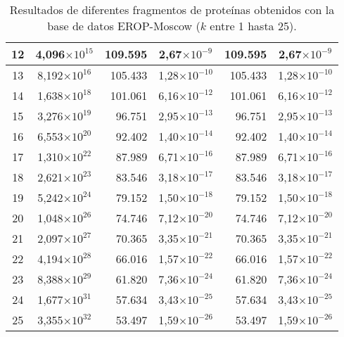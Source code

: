\begin{table}[!hbt]
\begin{tabular}{| c  r  r  c  r  c |}
    12 & \multicolumn{1}{c}{4,096$\times 10^{15}$} & 109.595 & 2,67$\times 10^{-9}$ & 109.595 & 2,67$\times 10^{-9}$ \\ \hline  
    13 & \multicolumn{1}{c}{8,192$\times 10^{16}$} & 105.433 & 1,28$\times 10^{-10}$ & 105.433 & 1,28$\times 10^{-10}$ \\ \hline
    14 & \multicolumn{1}{c}{1,638$\times 10^{18}$} & 101.061 & 6,16$\times 10^{-12}$ & 101.061 & 6,16$\times 10^{-12}$ \\ \hline  
    15 & \multicolumn{1}{c}{3,276$\times 10^{19}$} & 96.751 & 2,95$\times 10^{-13}$ & 96.751 & 2,95$\times 10^{-13}$ \\ \hline
    16 & \multicolumn{1}{c}{6,553$\times 10^{20}$} & 92.402 & 1,40$\times 10^{-14}$ & 92.402 & 1,40$\times 10^{-14}$ \\ \hline  
    17 & \multicolumn{1}{c}{1,310$\times 10^{22}$} & 87.989 & 6,71$\times 10^{-16}$ & 87.989 & 6,71$\times 10^{-16}$ \\ \hline
    18 & \multicolumn{1}{c}{2,621$\times 10^{23}$} & 83.546 & 3,18$\times 10^{-17}$ & 83.546 & 3,18$\times 10^{-17}$ \\ \hline  
    19 & \multicolumn{1}{c}{5,242$\times 10^{24}$} & 79.152 & 1,50$\times 10^{-18}$ & 79.152 & 1,50$\times 10^{-18}$ \\ \hline
    20 & \multicolumn{1}{c}{1,048$\times 10^{26}$} & 74.746 & 7,12$\times 10^{-20}$ & 74.746 & 7,12$\times 10^{-20}$ \\ \hline  
    21 & \multicolumn{1}{c}{2,097$\times 10^{27}$} & 70.365 & 3,35$\times 10^{-21}$ & 70.365 & 3,35$\times 10^{-21}$ \\ \hline
    22 & \multicolumn{1}{c}{4,194$\times 10^{28}$} & 66.016 & 1,57$\times 10^{-22}$ & 66.016 & 1,57$\times 10^{-22}$ \\ \hline  
    23 & \multicolumn{1}{c}{8,388$\times 10^{29}$} & 61.820 & 7,36$\times 10^{-24}$ & 61.820 & 7,36$\times 10^{-24}$ \\ \hline
    24 & \multicolumn{1}{c}{1,677$\times 10^{31}$} & 57.634 & 3,43$\times 10^{-25}$ & 57.634 & 3,43$\times 10^{-25}$ \\ \hline  
    25 & \multicolumn{1}{c}{3,355$\times 10^{32}$} & 53.497 & 1,59$\times 10^{-26}$ & 53.497 & 1,59$\times 10^{-26}$ \\ \hline        
    \end{tabular}
    \caption{Resultados de diferentes fragmentos de proteínas obtenidos con la base de datos EROP-Moscow ($k$ entre 1 hasta 25).}
    \label{tb:labela31}
\end{table}

